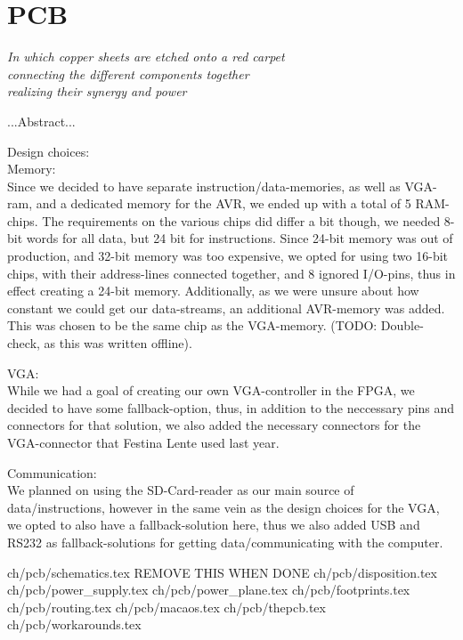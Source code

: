 \chapter {PCB}\label{ch:pcb}

\begin {flushright} {\slshape
    In which copper sheets are etched onto a red carpet\\
    connecting the different components together\\
    realizing their synergy and power
}
\end {flushright}
...Abstract...

Design choices: \\
Memory: \\
Since we decided to have separate instruction/data-memories, as well as VGA-ram, and
a dedicated memory for the AVR, we ended up with a total of 5 RAM-chips. The requirements
on the various chips did differ a bit though, we needed 8-bit words for all data, but
24 bit for instructions. Since 24-bit memory was out of production, and 32-bit memory
was too expensive, we opted for using two 16-bit chips, with their address-lines connected
together, and 8 ignored I/O-pins, thus in effect creating a 24-bit memory. Additionally,
as we were unsure about how constant we could get our data-streams, an additional
AVR-memory was added. This was chosen to be the same chip as the VGA-memory. (TODO: Double-check,
as this was written offline).

VGA: \\
While we had a goal of creating our own VGA-controller in the FPGA, we decided to have
some fallback-option, thus, in addition to the neccessary pins and connectors for that
solution, we also added the necessary connectors for the VGA-connector that Festina Lente
used last year.

Communication: \\
We planned on using the SD-Card-reader as our main source of data/instructions, however
in the same vein as the design choices for the VGA, we opted to also have a fallback-solution
here, thus we also added USB and RS232 as fallback-solutions for getting data/communicating
with the computer.

 {ch/pcb/schematics.tex}
REMOVE THIS WHEN DONE
 {ch/pcb/disposition.tex}
 {ch/pcb/power_supply.tex}
 {ch/pcb/power_plane.tex}
 {ch/pcb/footprints.tex}
 {ch/pcb/routing.tex}
 {ch/pcb/macaos.tex}
 {ch/pcb/thepcb.tex}
 {ch/pcb/workarounds.tex}
